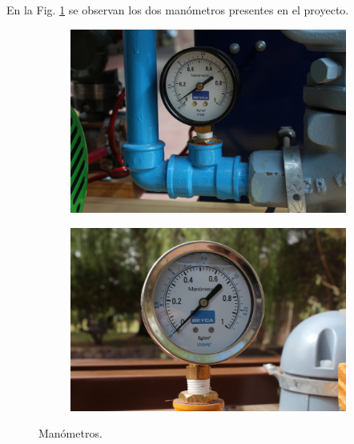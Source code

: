 En la Fig. \ref{fig:manometro} se observan los dos manómetros 
presentes en el proyecto.
\begin{figure}[ht]
        \centering
        \begin{subfigure}[b]{0.36\textwidth}
\includegraphics[width=\textwidth]
	{Cap2-DisenoEnsamblado/images/manometro1.JPG}
        \end{subfigure}%
        \hfil
        \begin{subfigure}[b]{0.36\textwidth}
\includegraphics[width=\textwidth]
	{Cap2-DisenoEnsamblado/images/manometro2.JPG}
        \end{subfigure}
        \caption{Manómetros.}
        \label{fig:manometro}
\end{figure}
